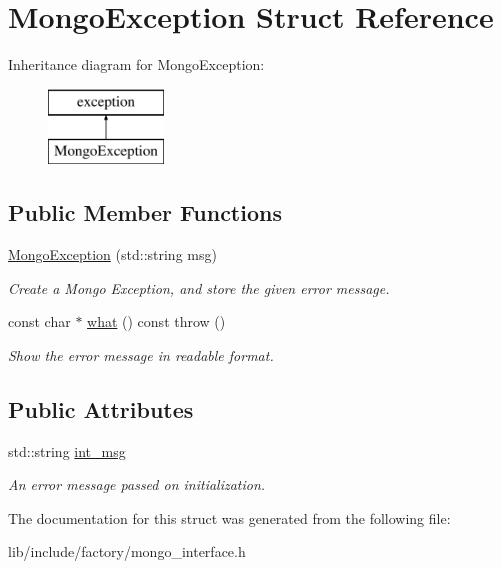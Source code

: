 \hypertarget{structMongoException}{\section{Mongo\-Exception Struct Reference}
\label{structMongoException}
}
Inheritance diagram for Mongo\-Exception\-:\begin{figure}[H]
\begin{center}
\leavevmode
\includegraphics[height=2.000000cm]{structMongoException}
\end{center}
\end{figure}
\subsection*{Public Member Functions}
\begin{DoxyCompactItemize}
\item 
\hypertarget{structMongoException_addaa545189ab30bcc6a0e957514253fa}{\hyperlink{structMongoException_addaa545189ab30bcc6a0e957514253fa}{Mongo\-Exception} (std\-::string msg)}\label{structMongoException_addaa545189ab30bcc6a0e957514253fa}

\begin{DoxyCompactList}\small\item\em Create a Mongo Exception, and store the given error message. \end{DoxyCompactList}\item 
\hypertarget{structMongoException_a5202b0dfc3d8a554d9f36e4b1c31c2a3}{const char $\ast$ \hyperlink{structMongoException_a5202b0dfc3d8a554d9f36e4b1c31c2a3}{what} () const   throw ()}\label{structMongoException_a5202b0dfc3d8a554d9f36e4b1c31c2a3}

\begin{DoxyCompactList}\small\item\em Show the error message in readable format. \end{DoxyCompactList}\end{DoxyCompactItemize}
\subsection*{Public Attributes}
\begin{DoxyCompactItemize}
\item 
\hypertarget{structMongoException_ae5a0824b7a469b66dcc3947704310e4c}{std\-::string \hyperlink{structMongoException_ae5a0824b7a469b66dcc3947704310e4c}{int\-\_\-msg}}\label{structMongoException_ae5a0824b7a469b66dcc3947704310e4c}

\begin{DoxyCompactList}\small\item\em An error message passed on initialization. \end{DoxyCompactList}\end{DoxyCompactItemize}


The documentation for this struct was generated from the following file\-:\begin{DoxyCompactItemize}
\item 
lib/include/factory/mongo\-\_\-interface.\-h\end{DoxyCompactItemize}
